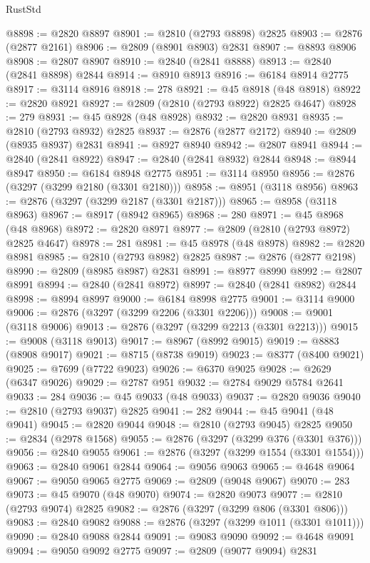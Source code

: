 \begin{lexlean}{RustStd}
\begin{coremodule}
@8898 := @2820 @8897
@8901 := @2810 (@2793 @8898) @2825
@8903 := @2876 (@2877 @2161)
@8906 := @2809 (@8901 @8903) @2831
@8907 := @8893 @8906
@8908 := @2807 @8907
@8910 := @2840 (@2841 @8888)
@8913 := @2840 (@2841 @8898) @2844
@8914 := @8910 @8913
@8916 := @6184 @8914 @2775
@8917 := @3114 @8916
@8918 := 278
@8921 := @45 @8918 (@48 @8918)
@8922 := @2820 @8921
@8927 := @2809 (@2810 (@2793 @8922) @2825 @4647)
@8928 := 279
@8931 := @45 @8928 (@48 @8928)
@8932 := @2820 @8931
@8935 := @2810 (@2793 @8932) @2825
@8937 := @2876 (@2877 @2172)
@8940 := @2809 (@8935 @8937) @2831
@8941 := @8927 @8940
@8942 := @2807 @8941
@8944 := @2840 (@2841 @8922)
@8947 := @2840 (@2841 @8932) @2844
@8948 := @8944 @8947
@8950 := @6184 @8948 @2775
@8951 := @3114 @8950
@8956 := @2876 (@3297 (@3299 @2180 (@3301 @2180)))
@8958 := @8951 (@3118 @8956)
@8963 := @2876 (@3297 (@3299 @2187 (@3301 @2187)))
@8965 := @8958 (@3118 @8963)
@8967 := @8917 (@8942 @8965)
@8968 := 280
@8971 := @45 @8968 (@48 @8968)
@8972 := @2820 @8971
@8977 := @2809 (@2810 (@2793 @8972) @2825 @4647)
@8978 := 281
@8981 := @45 @8978 (@48 @8978)
@8982 := @2820 @8981
@8985 := @2810 (@2793 @8982) @2825
@8987 := @2876 (@2877 @2198)
@8990 := @2809 (@8985 @8987) @2831
@8991 := @8977 @8990
@8992 := @2807 @8991
@8994 := @2840 (@2841 @8972)
@8997 := @2840 (@2841 @8982) @2844
@8998 := @8994 @8997
@9000 := @6184 @8998 @2775
@9001 := @3114 @9000
@9006 := @2876 (@3297 (@3299 @2206 (@3301 @2206)))
@9008 := @9001 (@3118 @9006)
@9013 := @2876 (@3297 (@3299 @2213 (@3301 @2213)))
@9015 := @9008 (@3118 @9013)
@9017 := @8967 (@8992 @9015)
@9019 := @8883 (@8908 @9017)
@9021 := @8715 (@8738 @9019)
@9023 := @8377 (@8400 @9021)
@9025 := @7699 (@7722 @9023)
@9026 := @6370 @9025
@9028 := @2629 (@6347 @9026)
@9029 := @2787 @951
@9032 := @2784 @9029 @5784 @2641
@9033 := 284
@9036 := @45 @9033 (@48 @9033)
@9037 := @2820 @9036
@9040 := @2810 (@2793 @9037) @2825
@9041 := 282
@9044 := @45 @9041 (@48 @9041)
@9045 := @2820 @9044
@9048 := @2810 (@2793 @9045) @2825
@9050 := @2834 (@2978 @1568)
@9055 := @2876 (@3297 (@3299 @376 (@3301 @376)))
@9056 := @2840 @9055
@9061 := @2876 (@3297 (@3299 @1554 (@3301 @1554)))
@9063 := @2840 @9061 @2844
@9064 := @9056 @9063
@9065 := @4648 @9064
@9067 := @9050 @9065 @2775
@9069 := @2809 (@9048 @9067)
@9070 := 283
@9073 := @45 @9070 (@48 @9070)
@9074 := @2820 @9073
@9077 := @2810 (@2793 @9074) @2825
@9082 := @2876 (@3297 (@3299 @806 (@3301 @806)))
@9083 := @2840 @9082
@9088 := @2876 (@3297 (@3299 @1011 (@3301 @1011)))
@9090 := @2840 @9088 @2844
@9091 := @9083 @9090
@9092 := @4648 @9091
@9094 := @9050 @9092 @2775
@9097 := @2809 (@9077 @9094) @2831

\end{coremodule}
\end{lexlean}
